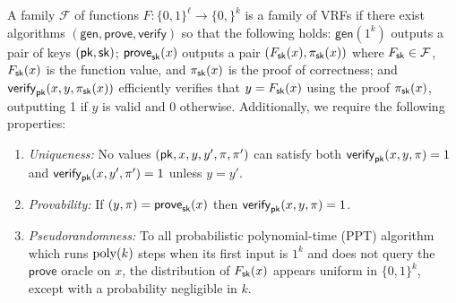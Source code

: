\newcommand{\Gen}{\mathsf{gen}}
\newcommand{\Prove}{\mathsf{prove}}
\newcommand{\Verify}{\mathsf{verify}}
\begin{definition}\label{def:VRF}
  A family $\mathcal{F}$ 
  of functions $F : \{0,1\}^\ell \rightarrow \{0,\}^k$ 
  is a family of VRFs if there exist algorithms 
  $(\Gen, \Prove, \Verify)$ 
  so that the following holds: 
  $\Gen(1^k)$ outputs a pair of keys $(\mathsf{pk}, \mathsf{sk})$; 
  $\Prove_\sk(x)$ outputs a pair $(F_{\mathsf{sk}}(x), \pi_{\mathsf{sk}}(x))$ 
  where 
  $F_{\mathsf{sk}} \in \mathcal{F}$, $F_{\mathsf{sk}}(x)$ is the function value, and 
  $\pi_{\mathsf{sk}}(x)$ is the proof of correctness; and 
  $\Verify_\pk(x,y,\pi_\sk(x))$ efficiently verifies 
  that $y = F_{\mathsf{sk}}(x)$ using the proof $\pi_{\mathsf{sk}}(x)$, 
  outputting 1 if $y$ is valid and 0 otherwise. 
  Additionally, we require the following properties:

  \begin{enumerate}
    \item \emph{Uniqueness:} 
    No values $(\mathsf{pk}, x, y, y', \pi, \pi')$  can satisfy both 
    $\Verify_\pk(x,y,\pi) = 1$ and $\Verify_\pk(x,y',\pi') = 1$ 
    unless $y = y'$.

    \item \emph{Provability:} 
    If $(y, \pi) = \Prove_\sk(x)$ then $\Verify_\pk(x,y, \pi) = 1$.

    \item \emph{Pseudorandomness:} 
    To all probabilistic polynomial-time (PPT) algorithm 
    which runs $\mathrm{poly}(k)$ steps when its first input is $1^k$ 
    and does not query the $\Prove$ oracle on $x$, 
    the distribution of $F_{\mathsf{sk}}(x)$ appears uniform in $\{0,1\}^k$, 
    except with a probability negligible in $k$.
  \end{enumerate}

\end{definition}


